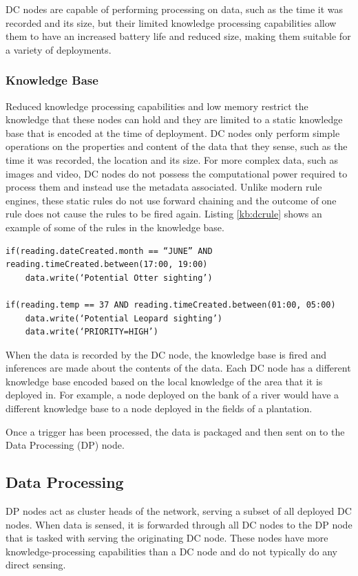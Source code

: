 	DC nodes are capable of performing processing on data, such as the time it was recorded and its size, but their limited knowledge processing capabilities allow them to have an increased battery life and reduced size, making them suitable for a variety of deployments.

	\subsubsection{Knowledge Base}
	Reduced knowledge processing capabilities and low memory restrict the knowledge that these nodes can hold and they are limited to a static knowledge base that is encoded at the time of deployment. DC nodes only perform simple operations on the properties and content of the data that they sense, such as the time it was recorded, the location and its size. For more complex data, such as images and video, DC nodes do not possess the computational power required to process them and instead use the metadata associated.
	Unlike modern rule engines, these static rules do not use forward chaining and the outcome of one rule does not cause the rules to be fired again. Listing \ref{kb:dcrule} shows an example of some of the rules in the knowledge base.

\begin{lstlisting}[breaklines=true, caption=Example DC Node Rules]
if(reading.dateCreated.month == “JUNE” AND reading.timeCreated.between(17:00, 19:00)
	data.write(‘Potential Otter sighting’)

if(reading.temp == 37 AND reading.timeCreated.between(01:00, 05:00)
	data.write(‘Potential Leopard sighting’)
	data.write(‘PRIORITY=HIGH’)
\end{lstlisting}

When the data is recorded by the DC node, the knowledge base is fired and inferences are made about the contents of the data. Each DC node has a different knowledge base encoded based on the local knowledge of the area that it is deployed in.  For example, a node deployed on the bank of a river would have a different knowledge base to a node deployed in the fields of a plantation.

Once a trigger has been processed, the data is packaged and then sent on to the Data Processing (DP) node.

	\subsection{Data Processing}
	DP nodes act as cluster heads of the network, serving a subset of all deployed DC nodes. When data is sensed, it is forwarded through all DC nodes to the DP node that is tasked with serving the originating DC node. These nodes have more knowledge-processing capabilities than a DC node and do not typically do any direct sensing. 


